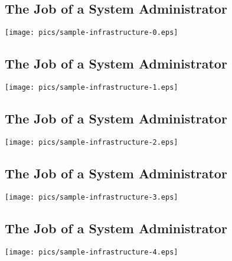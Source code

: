 \documentclass[xga]{xdvislides}
\begin{document}
\subsection{The Job of a System Administrator}
\vspace*{\fill}
\begin{center}
	\texttt{[image: pics/sample-infrastructure-0.eps]} \\
\end{center}
\vspace*{\fill}

\subsection{The Job of a System Administrator}
\vspace*{\fill}
\begin{center}
	\texttt{[image: pics/sample-infrastructure-1.eps]} \\
\end{center}
\vspace*{\fill}

\subsection{The Job of a System Administrator}
\vspace*{\fill}
\begin{center}
	\texttt{[image: pics/sample-infrastructure-2.eps]} \\
\end{center}
\vspace*{\fill}

\subsection{The Job of a System Administrator}
\vspace*{\fill}
\begin{center}
	\texttt{[image: pics/sample-infrastructure-3.eps]} \\
\end{center}
\vspace*{\fill}

\subsection{The Job of a System Administrator}
\vspace*{\fill}
\begin{center}
	\texttt{[image: pics/sample-infrastructure-4.eps]} \\
\end{center}
\vspace*{\fill}
\end{document}
